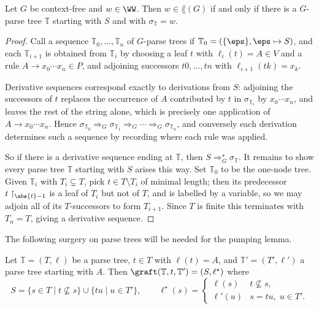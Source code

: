 \begin{proposition}\label{prop:parsetreeiff}
	Let $G$ be context-free and $w \in \WW$. Then $w \in \lang(G)$ if and only if there is a $G$-parse tree $\mathbb T$ starting with $S$ and with $\sigma_{\mathbb T} = w$.
\end{proposition}

\begin{proof}
	Call a sequence $\mathbb T_0, \dots, \mathbb T_n$ of $G$-parse trees  if $\mathbb T_0 = (\{\eps\}, \eps \mapsto S)$, and each $\mathbb T_{i+1}$ is obtained from $\mathbb T_i$ by choosing a leaf $t$ with $\ell_i(t) = A \in V$ and a rule $A \to x_0\cdots x_n \in P$, and adjoining successors $t0, \dots, tn$ with $\ell_{i+1}(tk) = x_k$.

	Derivative sequences correspond exactly to derivations from $S$: adjoining the successors of $t$ replaces the occurrence of $A$ contributed by $t$ in $\sigma_{\mathbb T_i}$ by $x_0\cdots x_n$, and leaves the rest of the string alone, which is precisely one application of $A \to x_0\cdots x_n$. Hence $\sigma_{\mathbb T_0} \Rightarrow_G \sigma_{\mathbb T_1} \Rightarrow_G \cdots \Rightarrow_G \sigma_{\mathbb T_n}$, and conversely each derivation determines such a sequence by recording where each rule was applied.

	So if there is a derivative sequence ending at $\mathbb T$, then $S \Rightarrow_G^\star \sigma_{\mathbb T}$. It remains to show every parse tree $\mathbb T$ starting with $S$ arises this way. Set $\mathbb T_0$ to be the one-node tree. Given $\mathbb T_i$ with $T_i \subsetneq T$, pick $t \in T \setminus T_i$ of minimal length; then its predecessor $t\restriction_{\abs{t}-1}$ is a leaf of $T_i$ but not of $T$, and is labelled by a variable, so we may adjoin all of its $T$-successors to form $T_{i+1}$. Since $T$ is finite this terminates with $T_n = T$, giving a derivative sequence.
\end{proof}

The following surgery on parse trees will be needed for the pumping lemma.

\begin{definition}[Grafting]
	Let $\mathbb T = (T,\ell)$ be a parse tree, $t \in T$ with $\ell(t) = A$, and $\mathbb T' = (T', \ell')$ a parse tree starting with $A$. Then $\graft(\mathbb T, t, \mathbb T') = (S,\ell^\star)$ where
	$$S = \{s \in T \mid t \not\subseteq s\} \cup \{tu \mid u \in T'\}, \qquad \ell^\star(s) = \begin{cases}\ell(s) & t \not\subseteq s,\\ \ell'(u) & s = tu,\; u \in T'.\end{cases}$$
\end{definition}

